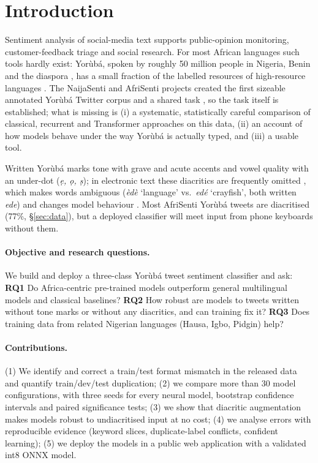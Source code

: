 \documentclass[11pt]{article}
\begin{document}
\section{Introduction}
Sentiment analysis of social-media text supports public-opinion monitoring, customer-feedback triage and social research. For most African languages such tools hardly exist: Yorùbá, spoken by roughly 50 million people in Nigeria, Benin and the diaspora \citep{eberhard-etal-2025-ethnologue}, has a small fraction of the labelled resources of high-resource languages \citep{joshi-etal-2020-state}. The NaijaSenti and AfriSenti projects \citep{muhammad-etal-2022-naijasenti,muhammad-etal-2023-afrisenti} created the first sizeable annotated Yorùbá Twitter corpus and a shared task \citep{muhammad-etal-2023-semeval}, so the task itself is established; what is missing is (i) a systematic, statistically careful comparison of classical, recurrent and Transformer approaches on this data, (ii) an account of how models behave under the way Yorùbá is actually typed, and (iii) a usable tool.

Written Yorùbá marks tone with grave and acute accents and vowel quality with an under-dot (\emph{ẹ, ọ, ṣ}); in electronic text these diacritics are frequently omitted \citep{orife-2018-attentive}, which makes words ambiguous (\emph{èdè} `language' vs.\ \emph{edé} `crayfish', both written \emph{ede}) and changes model behaviour \citep{adelani-etal-2021-effect}. Most AfriSenti Yorùbá tweets are diacritised (77\%, §\ref{sec:data}), but a deployed classifier will meet input from phone keyboards without them.

\paragraph{Objective and research questions.} We build and deploy a three-class Yorùbá tweet sentiment classifier and ask:
\textbf{RQ1} Do Africa-centric pre-trained models outperform general multilingual models and classical baselines?
\textbf{RQ2} How robust are models to tweets written without tone marks or without any diacritics, and can training fix it?
\textbf{RQ3} Does training data from related Nigerian languages (Hausa, Igbo, Pidgin) help?

\paragraph{Contributions.} (1) We identify and correct a train/test format mismatch in the released data and quantify train/dev/test duplication; (2) we compare more than 30 model configurations, with three seeds for every neural model, bootstrap confidence intervals and paired significance tests; (3) we show that diacritic augmentation makes models robust to undiacritised input at no cost; (4) we analyse errors with reproducible evidence (keyword slices, duplicate-label conflicts, confident learning); (5) we deploy the models in a public web application with a validated int8 ONNX model.
\end{document}
